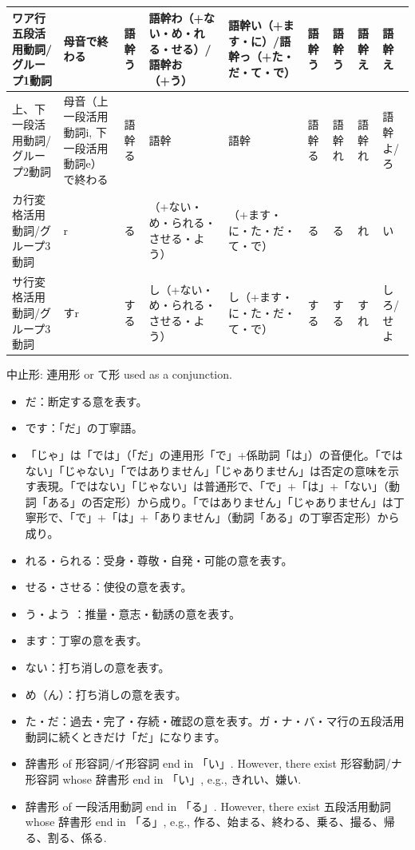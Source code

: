 \documentclass[a4paper,12pt]{article}
\begin{document}
\begin{longtable}[c]{|C{0.09\textwidth}|C{0.09\textwidth}|C{0.09\textwidth}|C{0.09\textwidth}|C{0.09\textwidth}|C{0.09\textwidth}|C{0.09\textwidth}|C{0.08\textwidth}|C{0.09\textwidth}|}
ワア行五段活用動詞/グループ1動詞 & 母音で終わる & 語幹う & 語幹わ（+ない・め・れる・せる）/語幹お（+う） & 語幹い（+ます・に）/語幹っ（+た・だ・て・で） & 語幹う & 語幹う & 語幹え & 語幹え \\\hline
上、下一段活用動詞/グループ2動詞 & 母音（上一段活用動詞i, 下一段活用動詞e）で終わる & 語幹る & 語幹 & 語幹 & 語幹る & 語幹れ & 語幹れ & 語幹よ/ろ \\\hline
カ行変格活用動詞/グループ3動詞 & r & る & （+ない・め・られる・させる・よう） & （+ます・に・た・だ・て・で） & る & る & れ & い \\\hline
サ行変格活用動詞/グループ3動詞 & すr & する & し（+ない・め・られる・させる・よう） & し（+ます・に・た・だ・て・で） & する & する & すれ & しろ/せよ \\\hline
\end{longtable}
中止形: 連用形 or て形 used as a conjunction.
\begin{itemize}
\item だ：断定する意を表す。
\item です：「だ」の丁寧語。
\item 「じゃ」は「では」（「だ」の連用形「で」+係助詞「は」）の音便化。「ではない」「じゃない」「ではありません」「じゃありません」は否定の意味を示す表現。「ではない」「じゃない」は普通形で、「で」+「は」+「ない」（動詞「ある」の否定形）から成り。「ではありません」「じゃありません」は丁寧形で、「で」+「は」+「ありません」（動詞「ある」の丁寧否定形）から成り。
\item れる・られる：受身・尊敬・自発・可能の意を表す。
\item せる・させる：使役の意を表す。
\item う・よう ：推量・意志・勧誘の意を表す。
\item ます：丁寧の意を表す。
\item ない：打ち消しの意を表す。
\item め（ん）：打ち消しの意を表す。
\item た・だ：過去・完了・存続・確認の意を表す。ガ・ナ・バ・マ行の五段活用動詞に続くときだけ「だ」になります。
\end{itemize}
\begin{itemize}
\item 辞書形 of 形容詞/イ形容詞 end in 「い」. However, there exist 形容動詞/ナ形容詞 whose 辞書形 end in 「い」, e.g., きれい、嫌い.
\item 辞書形 of 一段活用動詞 end in 「る」. However, there exist 五段活用動詞 whose 辞書形 end in 「る」, e.g., 作る、始まる、終わる、乗る、撮る、帰る、割る、係る.
\end{itemize}
\end{document}
